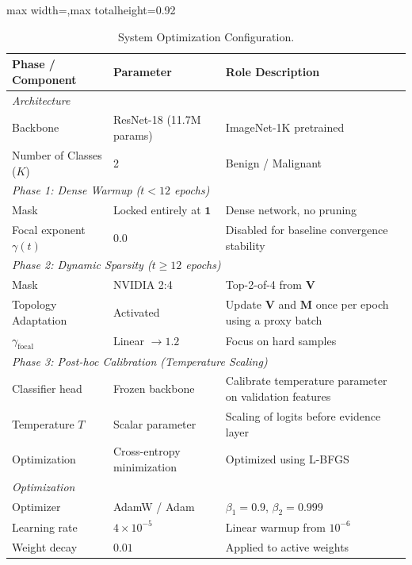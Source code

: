 \documentclass[letterpaper]{article} %
\begin{document}
\begin{table}[H]
\centering
\caption{System Optimization Configuration.}
\label{tab:config}
\scriptsize
\renewcommand{\arraystretch}{0.9}
\setlength{\tabcolsep}{2.0pt}
\begin{adjustbox}{max width=\columnwidth,max totalheight=0.92\textheight}
\begin{tabular}{@{}p{}p{}p{}@{}}
\toprule
\textbf{Phase / Component} & \textbf{Parameter} & \textbf{Role Description} \\
\midrule
\multicolumn{3}{l}{\emph{Architecture}} \\
Backbone & ResNet-18 (11.7M params) & ImageNet-1K pretrained \\
Number of Classes ($K$) & 2 & Benign / Malignant \\
\midrule
\multicolumn{3}{l}{\emph{Phase 1: Dense Warmup ($t < 12$ epochs)}} \\
Mask & Locked entirely at $\bm{1}$ & Dense network, no pruning \\
Focal exponent $\gamma(t)$ & $0.0$ & Disabled for baseline convergence stability \\
\midrule
\multicolumn{3}{l}{\emph{Phase 2: Dynamic Sparsity ($t \ge 12$ epochs)}} \\
Mask & NVIDIA 2:4 & Top-2-of-4 from $\bm{V}$ \\
Topology Adaptation & Activated & Update $\bm{V}$ and $\bm{M}$ once per epoch using a proxy batch \\
$\gamma_{\text{focal}}$ & Linear $\to 1.2$ & Focus on hard samples \\
\midrule
\multicolumn{3}{l}{\emph{Phase 3: Post-hoc Calibration (Temperature Scaling)}} \\
Classifier head & Frozen backbone & Calibrate temperature parameter on validation features \\
Temperature $T$ & Scalar parameter & Scaling of logits before evidence layer \\
Optimization & Cross-entropy minimization & Optimized using L-BFGS \\
\midrule
\multicolumn{3}{l}{\emph{Optimization}} \\
Optimizer & AdamW / Adam~\cite{loshchilov2019decoupled,kingma2015adam} & $\beta_1=0.9$, $\beta_2=0.999$ \\
Learning rate & $4 \times 10^{-5}$ & Linear warmup from $10^{-6}$ \\
Weight decay & $0.01$ & Applied to active weights \\

\end{tabular}
\end{adjustbox}
\end{table}
\end{document}
